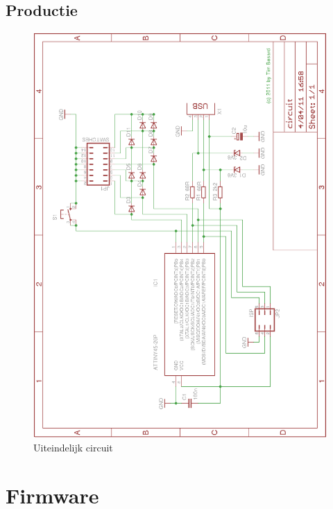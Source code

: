 \documentclass[verslag.tex]{subfiles}
\begin{document}
\section{Productie}

\begin{figure}
	\includegraphics[width=\textwidth]{afbeeldingen/circuit}
	\caption{Uiteindelijk circuit}
\end{figure}

\chapter{Firmware}
\end{document}

